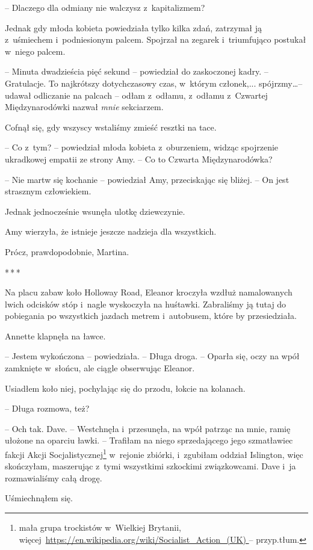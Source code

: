 \documentclass[oneside,polish,11pt,sfheadings]{mwbk}
\newcommand{\threeast}{\bigskip\par\centerline{*\,*\,*}\medskip\par}
\begin{document}
-- Dlaczego dla odmiany nie walczysz z~kapitalizmem?

Jednak gdy młoda kobieta powiedziała tylko kilka zdań, zatrzymał ją z~uśmiechem i~podniesionym palcem. Spojrzał na zegarek i~triumfująco
postukał w~niego palcem.

-- Minuta dwadzieścia pięć sekund -- powiedział do zaskoczonej kadry. -- Gratulacje. To najkrótszy dotychczasowy czas, w~którym członek,...
spójrzmy\ldots -- udawał odliczanie na palcach -- odłam z~odłamu, z~odłamu z~Czwartej Międzynarodówki nazwał \emph{mnie} sekciarzem.

Cofnął się, gdy wszyscy wstaliśmy zmieść resztki na tace.

-- Co z~tym? -- powiedział młoda kobieta z~oburzeniem, widząc spojrzenie
ukradkowej empatii ze strony Amy. -- Co to Czwarta Międzynarodówka?

-- Nie martw się kochanie -- powiedział Amy, przeciskając się bliżej. -- On
jest strasznym człowiekiem.

Jednak jednocześnie wsunęła ulotkę dziewczynie.

Amy wierzyła, że istnieje jeszcze nadzieja dla wszystkich.

Prócz, prawdopodobnie, Martina.

\threeast

Na placu zabaw koło Holloway Road, Eleanor kroczyła wzdłuż namalowanych
lwich odcisków stóp i~nagle wyskoczyła na huśtawki. Zabraliśmy ją tutaj
do pobiegania po wszystkich jazdach metrem i~autobusem, które by
przesiedziała.

Annette klapnęła na ławce. 

-- Jestem wykończona -- powiedziała. -- Długa
droga. -- Oparła się, oczy na wpół zamknięte w~słońcu, ale ciągle
obserwując Eleanor.

Usiadłem koło niej, pochylając się do przodu, łokcie na kolanach.

-- Długa rozmowa, też?

-- Och tak. Dave. -- Westchnęła i~przesunęła, na wpół patrząc na mnie,
ramię ułożone na oparciu ławki. -- Trafiłam na niego sprzedającego jego
szmatławiec fakcji Akcji Socjalistycznej\footnote{mała grupa trockistów w~Wielkiej Brytanii,
więcej~\url{https://en.wikipedia.org/wiki/Socialist_Action_(UK)
} -- przyp.tłum.} w~rejonie zbiórki, i~zgubiłam oddział Islington, więc
skończyłam, maszerując z~tymi wszystkimi szkockimi związkowcami. Dave i~ja rozmawialiśmy całą drogę.

Uśmiechnąłem się. 
\end{document}
